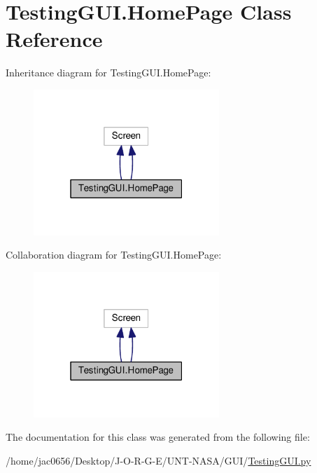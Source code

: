 \hypertarget{classTestingGUI_1_1HomePage}{}\section{Testing\+G\+U\+I.\+Home\+Page Class Reference}
\label{classTestingGUI_1_1HomePage}


Inheritance diagram for Testing\+G\+U\+I.\+Home\+Page\+:
\nopagebreak
\begin{figure}[H]
\begin{center}
\leavevmode
\includegraphics[width=199pt]{classTestingGUI_1_1HomePage__inherit__graph}
\end{center}
\end{figure}


Collaboration diagram for Testing\+G\+U\+I.\+Home\+Page\+:
\nopagebreak
\begin{figure}[H]
\begin{center}
\leavevmode
\includegraphics[width=199pt]{classTestingGUI_1_1HomePage__coll__graph}
\end{center}
\end{figure}


The documentation for this class was generated from the following file\+:\begin{DoxyCompactItemize}
\item 
/home/jac0656/\+Desktop/\+J-\/\+O-\/\+R-\/\+G-\/\+E/\+U\+N\+T-\/\+N\+A\+S\+A/\+G\+U\+I/\hyperlink{GUI_2TestingGUI_8py}{Testing\+G\+U\+I.\+py}\end{DoxyCompactItemize}

